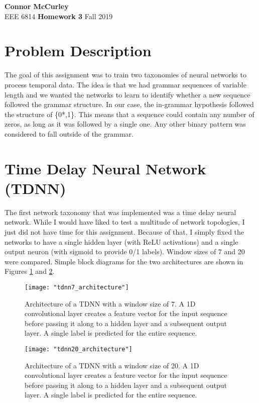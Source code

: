 \documentclass{article}[12 pt]
\begin{document}
	
\begin{center}
	\textbf{\Large Connor McCurley} \\
	EEE 6814 \qquad \textbf{\large Homework 3} \qquad Fall 2019 
\end{center}




\section*{Problem Description}
The goal of this assignment was to train two taxonomies of neural networks to process temporal data.  The idea is that we had grammar sequences of variable length and we wanted the networks to learn to identify whether a new sequence followed the grammar structure.  In our case, the in-grammar hypothesis followed the structure of \{0*,1\}.  This means that a sequence could contain any number of zeros, as long as it was followed by a single one.  Any other binary pattern was considered to fall outside of the grammar.  

\section*{Time Delay Neural Network (TDNN)}
The first network taxonomy that was implemented was a time delay neural network.  While I would have liked  to test a multitude of network topologies, I just did not have time for this assignment.  Because of that, I simply fixed the networks to have a single hidden layer (with ReLU activations) and a single output neuron (with sigmoid to provide 0/1 labels).  Window sizes of 7 and 20 were compared.  Simple block diagrams for the two architectures are shown in Figures \ref{fig:tdnn7_architecture} and \ref{fig:tdnn20_architecture}. 

\begin{center}
	\begin{figure}[H]
		\centering
		\texttt{[image: "tdnn7\_architecture"]}
		\caption{Architecture of a TDNN with a window size of 7.  A 1D convolutional layer creates a feature vector for the input sequence before passing it along to a hidden layer and a subsequent output layer.  A single label is predicted for the entire sequence.}
		\label{fig:tdnn7_architecture}
	\end{figure}
\end{center}

\begin{center}
	\begin{figure}[H]
		\centering
		\texttt{[image: "tdnn20\_architecture"]}
		\caption{Architecture of a TDNN with a window size of 20.  A 1D convolutional layer creates a feature vector for the input sequence before passing it along to a hidden layer and a subsequent output layer.  A single label is predicted for the entire sequence.}
		\label{fig:tdnn20_architecture}
	\end{figure}
\end{center}
\end{document}
